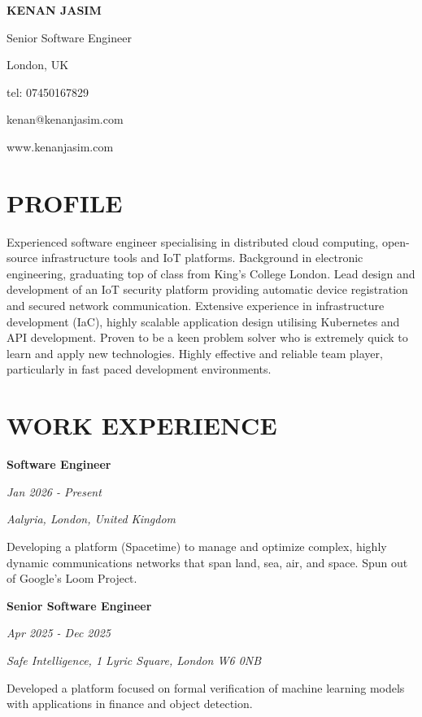\documentclass[11pt,a4paper]{article}
\newcommand{\header}[6]{
    \noindent
    \begin{minipage}[t]{0.6\textwidth}
        {\Huge\bfseries #1}
        
        \vspace{5pt}
        {\Large #2}
    \end{minipage}%
    \hfill
    \begin{minipage}[t]{0.35\textwidth}
        \raggedleft
        #3
        
        tel: #4
        
        #5
        
        #6
    \end{minipage}
    
    \vspace{20pt}
}
\newcommand{\cventry}[5]{
    \noindent
    \begin{minipage}[t]{0.3\textwidth}
        \raggedright
        \textbf{#1}
        
        \textit{#2}
    \end{minipage}%
    \hfill
    \begin{minipage}[t]{0.7\textwidth}
        \raggedright
        \textit{#3}
        
        #4
        
        #5
    \end{minipage}
    
    \vspace{8pt}
}
\begin{document}
\header{KENAN JASIM}{Senior Software Engineer}{London, UK}{07450167829}{kenan@kenanjasim.com}{www.kenanjasim.com}

\section{PROFILE}
Experienced software engineer specialising in distributed cloud computing, open-source infrastructure tools and IoT platforms. Background in electronic engineering, graduating top of class from King's College London. Lead design and development of an IoT security platform providing automatic device registration and secured network communication. Extensive experience in infrastructure development (IaC), highly scalable application design utilising Kubernetes and API development. Proven to be a keen problem solver who is extremely quick to learn and apply new technologies. Highly effective and reliable team player, particularly in fast paced development environments.

\section{WORK EXPERIENCE}

\cventry{Software Engineer}{Jan 2026 - Present}{Aalyria, London, United Kingdom}{}{
Developing a platform (Spacetime) to manage and optimize complex, highly dynamic communications networks that span land, sea, air, and space. Spun out of Google's Loom Project.
}

\cventry{Senior Software Engineer}{Apr 2025 - Dec 2025}{Safe Intelligence, 1 Lyric Square, London W6 0NB}{}{
Developed a platform focused on formal verification of machine learning models with applications in finance and object detection.
}
\end{document}
